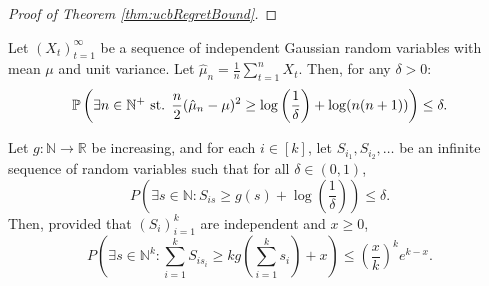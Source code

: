 \begin{proof}[Proof of Theorem \ref{thm:ucbRegretBound}]
\end{proof}


\label{lem:upperBoundSeq}
\begin{lemma}
Let $(X_t)_{t=1}^\infty$ be a sequence of independent Gaussian random variables with mean $\mu$ and unit variance. Let $\hat{\mu}_n = \frac{1}{n} \sum_{t=1}^n X_t$. Then, for any $\delta > 0$:
$$
\mathbb{P}\left(\exists n \in \mathbb{N}^+ \text{ st. } \frac{n}{2} (\hat{\mu}_n - \mu)^2 \geq \log\left(\frac{1}{\delta}\right) + \log(n(n + 1))\right) \leq \delta.
$$
\end{lemma}

\label{lem:increasingSeqUpper}
\begin{lemma}
Let $g : \mathbb{N} \to \mathbb{R}$ be increasing, and for each $i \in [k]$, let $S_{i_1}, S_{i_2}, \ldots$ be an infinite sequence of random variables such that for all $\delta \in (0, 1)$,
$$
P \left(\exists s \in \mathbb{N} : S_{is} \geq g(s) + \log\left(\frac{1}{\delta}\right)\right) \leq \delta.
$$
Then, provided that $(S_i)_{i=1}^k$ are independent and $x \geq 0$,
\[
P \left(\exists s \in \mathbb{N}^k : \sum_{i=1}^k S_{is_i} \geq kg \left(\sum_{i=1}^k s_i\right) + x\right) \leq \left(\frac{x}{k}\right)^k e^{k-x}.
\]
\end{lemma}
